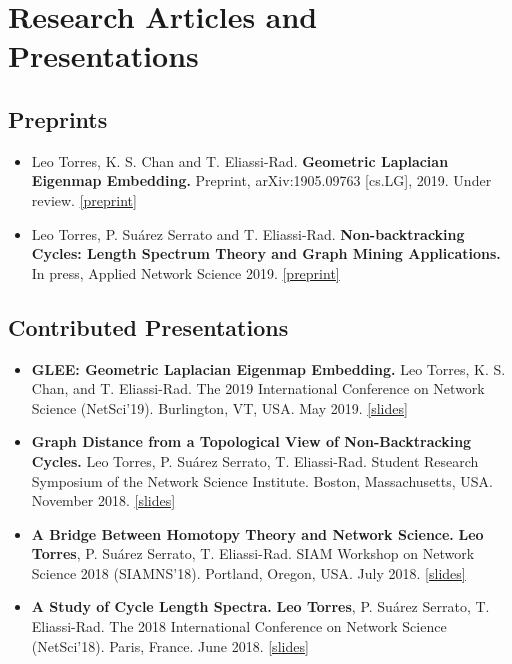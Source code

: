 \documentclass[12pt,]{scrartcl}
\begin{document}
\newpage
\section{Research Articles and Presentations}\label{publications}

\subsection{Preprints}\label{preprints}

\begin{itemize}
\leftskip-0.25in %

\item Leo Torres, K. S. Chan and T. Eliassi-Rad. \textbf{Geometric Laplacian Eigenmap Embedding.} Preprint, arXiv:1905.09763 [cs.LG], 2019. Under review. \href{https://arxiv.org/abs/1905.09763}{[preprint]}

\item Leo Torres, P. Suárez Serrato and T. Eliassi-Rad. \textbf{Non-backtracking Cycles: Length Spectrum Theory and Graph Mining Applications.} In press, Applied Network Science 2019. \href{https://arxiv.org/abs/1807.09592}{[preprint]}

\end{itemize}


\subsection{Contributed Presentations}\label{contributed-presentations}

\begin{itemize}
\leftskip-0.25in

\item \textbf{GLEE: Geometric Laplacian Eigenmap Embedding.} Leo Torres, K. S. Chan, and T. Eliassi-Rad. The 2019 International Conference on Network Science (NetSci'19). Burlington, VT, USA. May 2019. \href{http://leotrs.com/static/GLEE_netsci19.pdf}{[slides]}

\item \textbf{Graph Distance from a Topological View of Non-Backtracking Cycles.} Leo Torres, P. Suárez Serrato, T. Eliassi-Rad. Student Research Symposium of the Network Science Institute. Boston, Massachusetts, USA. November 2018. \href{http://leotrs.com/static/netsci18.pdf}{[slides]}

\item \textbf{A Bridge Between Homotopy Theory and Network Science.} \textbf{Leo Torres}, P. Suárez Serrato, T. Eliassi-Rad. SIAM Workshop on Network Science 2018 (SIAMNS'18). Portland, Oregon, USA. July 2018. \href{http://leotrs.com/static/siamns18.pdf}{[slides]}

\item \textbf{A Study of Cycle Length Spectra.} \textbf{Leo Torres}, P. Suárez Serrato, T. Eliassi-Rad. The 2018 International Conference on Network Science (NetSci'18). Paris, France. June 2018. \href{http://leotrs.com/static/netsci18.pdf}{[slides]}

\end{itemize}
\end{document}
